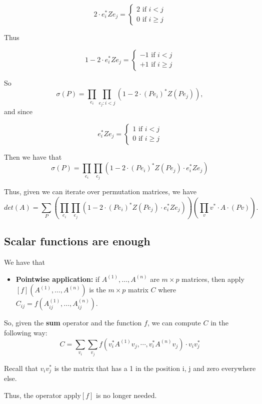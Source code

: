  		\[
  			2\cdot e_i^*Ze_j=\begin{cases}
               2 \text{ if } i < j \\
               0 \text{ if } i \geq j
            \end{cases}
		\]
		
Thus

		\[
  			1-2\cdot e_i^*Ze_j=\begin{cases}
               -1 \text{ if } i < j \\
               +1 \text{ if } i \geq j
            \end{cases}
		\]

So $$\sigma(P)=\prod_{e_i}\prod_{e_j:i<j}\left(1-2\cdot (Pe_i)^*Z(Pe_j)\right),$$ and since 

		\[
  			e_i^*Ze_j=\begin{cases}
               1 \text{ if } i < j \\
               0 \text{ if } i \geq j
            \end{cases}
		\]

Then we have that $$\sigma(P)=\prod_{e_i}\prod_{e_j}\left(1-2\cdot (Pe_i)^*Z(Pe_j)\cdot e_i^*Ze_j\right)$$

Thus, given we can iterate over permutation matrices, we have $$det(A)=\sum_{P}\left(\prod_{e_i}\prod_{e_j}\left(1-2\cdot (Pe_i)^*Z(Pe_j)\cdot e_i^*Ze_j\right)\right)\left(\prod_v v^*\cdot A\cdot (Pv)\right).$$

\subsection*{Scalar functions are enough}

We have that 

\begin{itemize}
	\item \textbf{Pointwise application:} if $A^{(1)}, \ldots, A^{(n)}$ are $m\times p$ matrices, then apply$\left[ f \right](A^{(1)}, \ldots, A^{(n)})$ is the $m\times p$ matrix $C$ where $C_{ij}=f(A^{(1)}_{ij}, \ldots, A^{(n)}_{ij})$.
\end{itemize}

So, given the \textbf{sum} operator and the function $f$, we can compute $C$ in the following way: $$C=\sum_{v_i}\sum_{v_j}f\left( v_i^*A^{(1)}v_j, \cdots, v_i^*A^{(n)}v_j\right)\cdot v_iv_j^*$$

Recall that $v_iv_j^*$ is the matrix that has a 1 in the position i, j and zero everywhere else.

Thus, the operator apply$\left[ f \right]$ is no longer needed.

